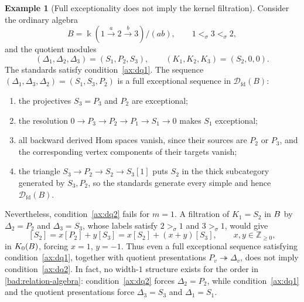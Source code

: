 \documentclass[11pt,a4paper]{article}
\newcommand{\D}{\mathcal D}
\newcommand{\ZZ}{\mathbb{Z}}
\newcommand{\std}{\Delta}
\DeclareMathOperator{\fd}{fd}
\let\mod\relax
\DeclareMathOperator{\mod}{mod}
\theoremstyle{plain}
\theoremstyle{definition}
\newtheorem{example}[theorem]{Example}
\numberwithin{equation}{section}
\begin{document}
\begin{example}[Full exceptionality does not imply the kernel filtration]
\label{bad:exceptional-filtration}
Consider the ordinary algebra
\begin{equation}\label{bad:relation-algebra}
 B=\Bbbk(1\xrightarrow{a}2\xrightarrow{b}3)/(ab),
 \qquad 1<_\sigma3<_\sigma2,
\end{equation}
and the quotient modules
\begin{equation}\label{bad:relation-standards}
 (\std_1,\std_2,\std_3)=(S_1,P_2,S_3),
 \qquad(K_1,K_2,K_3)=(S_2,0,0).
\end{equation}
The standards satisfy condition~\ref{ax:dq1}. The sequence
$(\std_1,\std_3,\std_2)=(S_1,S_3,P_2)$ is a full exceptional
sequence in $\D_{\fd}(B)$:
\begin{enumerate}[label=\textup{(\roman*)}]
 \item the projectives $S_3=P_3$ and $P_2$ are exceptional;
 \item the resolution
 $0\to P_3\to P_2\to P_1\to S_1\to0$ makes $S_1$ exceptional;
 \item all backward derived Hom spaces vanish, since their
 sources are $P_2$ or $P_3$, and the corresponding vertex components
 of their targets vanish;
 \item the triangle $S_3\to P_2\to S_2\to S_3[1]$ puts $S_2$ in
 the thick subcategory generated by $S_3,P_2$, so the standards
 generate every simple and hence $\D_{\fd}(B)$.
\end{enumerate}
Nevertheless, condition~\ref{ax:dq2} fails for $m=1$. A filtration
of $K_1=S_2$ in $\mod B$ by $\std_2=P_2$ and $\std_3=S_3$,
whose labels satisfy $2>_\sigma1$ and $3>_\sigma1$, would give
\begin{equation}\label{bad:relation-multiplicities}
 [S_2]=x[P_2]+y[S_3]=x[S_2]+(x+y)[S_3],
 \qquad x,y\in\ZZ_{\geq0},
\end{equation}
in $K_0(\mod B)$, forcing $x=1$, $y=-1$. Thus even a full
exceptional sequence satisfying condition~\ref{ax:dq1}, together
with quotient presentations $P_v\twoheadrightarrow\std_v$, does
not imply condition~\ref{ax:dq2}. In fact, no width-$1$ structure
exists for the order in \eqref{bad:relation-algebra}:
condition~\ref{ax:dq2} forces $\std_2=P_2$, while
condition~\ref{ax:dq1} and the quotient presentations force
$\std_3=S_3$ and $\std_1=S_1$.


\end{example}
\end{document}
